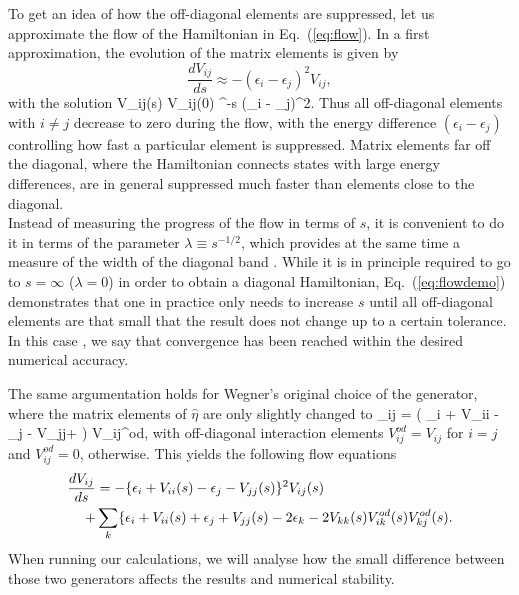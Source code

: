 To get an idea of how the off-diagonal elements are suppressed, let us approximate the flow of the Hamiltonian in Eq.~(\ref{eq:flow}). In a first approximation, the evolution of the matrix elements is given by
\[
\frac{d V_{ij}}{ds} \approx -(\epsilon_i - \epsilon_j)^2 V_{ij},
\]
with the solution
\be
V_{ij}(s) \approx V_{ij}(0) ^{-s (\epsilon_i - \epsilon_j)^2}.
\label{eq:flowdemo}
\ee
Thus all off-diagonal elements with $i \neq j$ decrease to zero during the flow, with the energy difference $(\epsilon_i - \epsilon_j)$ controlling how fast a particular element is suppressed. Matrix elements far off the diagonal, where the Hamiltonian connects states with large energy differences, are in general suppressed much faster than elements close to the diagonal. \\
Instead of measuring the progress of the flow in terms of $s$, it is convenient to do it in terms of the parameter $\lambda \equiv s^{-1/2}$, which provides at the same time a measure of the width of the diagonal band \cite{PhysRepWegner0,kehrein2006flow}. 
While it is in principle required to go to $s = \infty$ ($\lambda = 0$) in order to obtain a diagonal Hamiltonian, Eq.~(\ref{eq:flowdemo}) demonstrates that one in practice only needs to increase $s$ until all off-diagonal elements are that small that the result does not change up to a  certain tolerance. In this case , we say that convergence has been reached within the desired numerical accuracy.

The same argumentation holds for Wegner's original choice of the generator, where the matrix elements of $\hat{\eta}$ are only slightly changed to
\be
 \eta_{ij} = \left( \epsilon_i + V_{ii} - \epsilon_j - V_{jj}+ \right) V_{ij}^{od},
 \label{eq:etaWegner}
\ee
with off-diagonal interaction elements $V_{ij}^{od} = V_{ij}$ for $i = j$ and  $ V_{ij}^{od} = 0$, otherwise. This yields the following flow equations
\begin{align}
\frac{d V_{ij}}{ds } &= -\lbrace\epsilon_i + V_{ii}(s) - \epsilon_j - V_{jj}(s)\rbrace^2 V_{ij}(s) \notag \\
+ &  \sum\limits_k \lbrace\epsilon_i + V_{ii}(s) + \epsilon_j + V_{jj}(s) -2 \epsilon_k -2 V_{kk}(s) V_{ik}^{od}(s) V_{kj}^{od}(s).
\label{eq:flowWegner}
\end{align}
When running our calculations, we will analyse how the small difference between those two generators affects the results and numerical stability.

